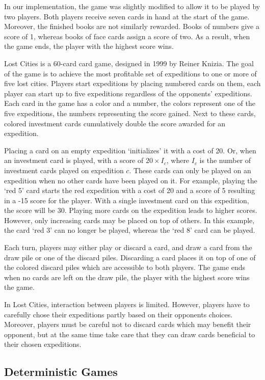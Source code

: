 \documentclass[a4paper]{llncs}
\begin{document}
In our implementation, the game was slightly modified to allow it to be played by two players. Both players receive seven cards in hand at the start of the game. Moreover, the finished books are not similarly rewarded. Books of numbers give a score of 1, whereas books of face cards assign a score of two. As a result, when the game ends, the player with the highest score wins.

{\sc Lost Cities} is a 60-card card game, designed in 1999 by Reiner Knizia. The goal of the game is to achieve the most profitable set of expeditions to one or more of five lost cities. Players start expeditions by placing numbered cards on them, each player can start up to five expeditions regardless of the opponents' expeditions. Each card in the game has a color and a number, the colors represent one of the five expeditions, the numbers representing the score gained. Next to these cards, colored investment cards cumulatively double the score awarded for an expedition. 

Placing a card on an empty expedition `initializes' it with a cost of 20. Or, when an investment card is played, with a score of $20\times I_c$, where $I_c$ is the number of investment cards played on expedition $c$. These cards can only be played on an expedition when no other cards have been played on it. For example, playing the `red 5' card starts the red expedition with a cost of 20 and a score of 5 resulting in a -15 score for the player. With a single investment card on this expedition, the score will be 30. Playing more cards on the expedition leads to higher scores. However, only increasing cards may be placed on top of others. In this example, the card `red 3' can no longer be played, whereas the `red 8' card can be played.

Each turn, players may either play or discard a card, and draw a card from the draw pile or one of the discard piles. Discarding a card places it on top of one of the colored discard piles which are accessible to both players. The game ends when no cards are left on the draw pile, the player with the highest score wins the game.

In Lost Cities, interaction between players is limited. However, players have to carefully chose their expeditions partly based on their opponents choices. Moreover, players must be careful not to discard cards which may benefit their opponent, but at the same time take care that they can draw cards beneficial to their chosen expeditions.

\subsection{Deterministic Games}
\end{document}
